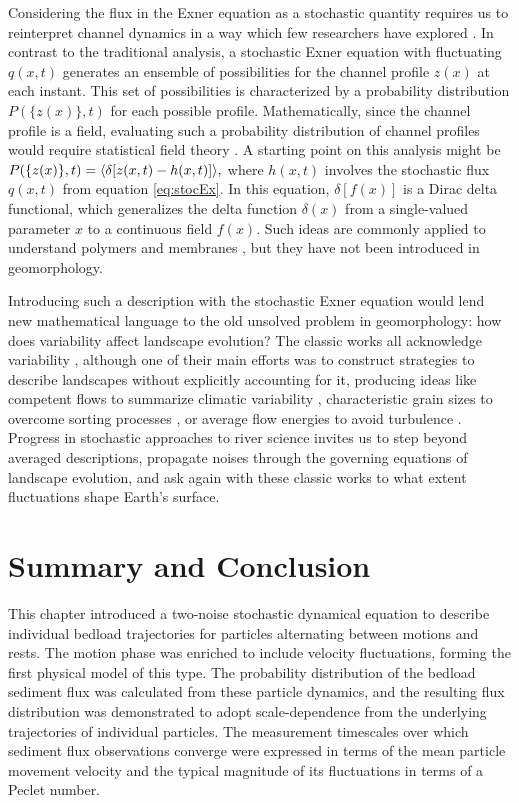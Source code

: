 Considering the flux in the Exner equation as a stochastic quantity requires us to reinterpret channel dynamics in a way which few researchers have explored \citep{Jerolmack2005,Bohorquez2016}.
In contrast to the traditional analysis, a stochastic Exner equation with fluctuating $q(x,t)$ generates an ensemble of possibilities for the channel profile $z(x)$ at each instant. This set of possibilities is characterized by a probability distribution $P(\{z(x)\},t)$ for each possible profile.
Mathematically, since the channel profile is a field, evaluating such a probability distribution of channel profiles would require statistical field theory \citep{Kardar2007}.
A starting point on this analysis might be $P(\{z(x)\},t) = \langle \delta[z(x,t)-h(x,t)]\rangle,$ where $h(x,t)$ involves the stochastic flux $q(x,t)$ from equation \ref{eq:stocEx}.
In this equation, $\delta[f(x)]$ is a Dirac delta functional, which generalizes the delta function $\delta(x)$ from a single-valued parameter $x$ to a continuous field $f(x)$.
Such ideas are commonly applied to understand polymers and membranes \citep{Kawakatsu2001,Nelson2004}, but they have not been introduced in geomorphology.

Introducing such a description with the stochastic Exner equation would lend new mathematical language to the old unsolved problem in geomorphology: how does variability affect landscape evolution?
The classic works all acknowledge variability \citep{Leopold1952}, although one of their main efforts was to construct strategies to describe landscapes without explicitly accounting for it, producing ideas like competent flows to summarize climatic variability \citep{Wolman1959,Wolman1978}, characteristic grain sizes to overcome sorting processes \citep{Parker1982}, or average flow energies to avoid turbulence \citep{Bagnold1954}.
Progress in stochastic approaches to river science \citep[e.g.][]{Furbish2021c,Ancey2020b} invites us to step beyond averaged descriptions, propagate noises through the governing equations of landscape evolution, and ask again with these classic works to what extent fluctuations shape Earth's surface.

\section{Summary and Conclusion \label{sec:conc}} 
 
This chapter introduced a two-noise stochastic dynamical equation to describe individual bedload trajectories for particles alternating between motions and rests. The motion phase was enriched to include velocity fluctuations, forming the first physical model of this type.
The probability distribution of the bedload sediment flux was calculated from these particle dynamics, and the resulting flux distribution was demonstrated to adopt scale-dependence from the underlying trajectories of individual particles. The measurement timescales over which sediment flux observations converge were expressed in terms of the mean particle movement velocity and the typical magnitude of its fluctuations in terms of a Peclet number.
 
